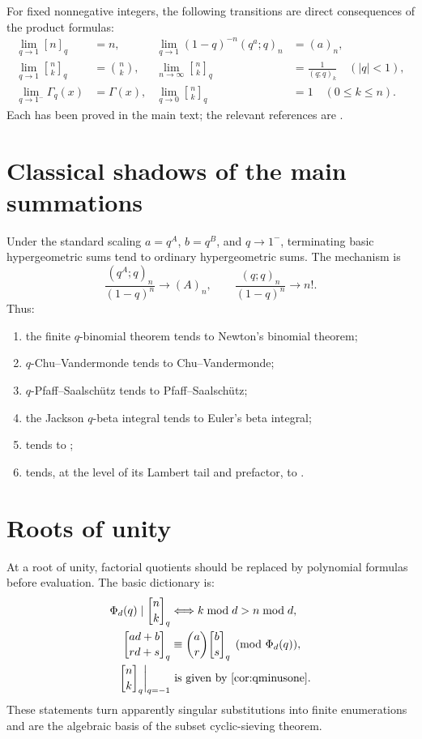 \documentclass[11pt,oneside,openany]{book}
\theoremstyle{definition}
\theoremstyle{remark}
\newcommand{\qbinom}[2]{\genfrac{[}{]}{0pt}{}{#1}{#2}_{q}}
\newcommand{\Qbinom}[3]{\genfrac{[}{]}{0pt}{}{#1}{#2}_{#3}}
\newcommand{\abs}[1]{\lvert #1\rvert}
\begin{document}
For fixed nonnegative integers, the following transitions are direct consequences of the product formulas:
\begin{align*}
 \lim_{q\to1}[n]_q&=n,
 &\lim_{q\to1}(1-q)^{-n}(q^a;q)_n&=(a)_n,\\
 \lim_{q\to1}\qbinom nk&=\binom nk,
 &\lim_{n\to\infty}\qbinom nk&=\frac1{(q;q)_k}\quad(\abs q<1),\\
 \lim_{q\to1^-}\Gamma_q(x)&=\Gamma(x),
 &\lim_{q\to0}\qbinom nk&=1\quad(0\le k\le n).
\end{align*}
Each has been proved in the main text; the relevant references are .

\section{Classical shadows of the main summations}

Under the standard scaling $a=q^A$, $b=q^B$, and $q\to1^-$, terminating basic hypergeometric sums tend to ordinary hypergeometric sums.  The mechanism is
\[
 \frac{(q^A;q)_n}{(1-q)^n}\longrightarrow(A)_n,
 \qquad
 \frac{(q;q)_n}{(1-q)^n}\longrightarrow n!.
\]
Thus:
\begin{enumerate}
\item the finite $q$-binomial theorem tends to Newton's binomial theorem;
\item $q$-Chu--Vandermonde tends to Chu--Vandermonde;
\item $q$-Pfaff--Saalsch\"utz tends to Pfaff--Saalsch\"utz;
\item the Jackson $q$-beta integral tends to Euler's beta integral;
\item {} tends to ;
\item {} tends, at the level of its Lambert tail and prefactor, to .
\end{enumerate}

\section{Roots of unity}

At a root of unity, factorial quotients should be replaced by polynomial formulas before evaluation.  The basic dictionary is:
\begin{align*}
 \Phi_d(q)\mid\qbinom nk
 &\Longleftrightarrow k\bmod d>n\bmod d,\\
 \Qbinom{ad+b}{rd+s}q
 &\equiv\binom ar\Qbinom bsq\pmod{\Phi_d(q)},\\
 \qbinom nk\bigg|_{q=-1}
 &\text{ is given by \Cref{cor:qminusone}.}
\end{align*}
These statements turn apparently singular substitutions into finite enumerations and are the algebraic basis of the subset cyclic-sieving theorem.
\end{document}
